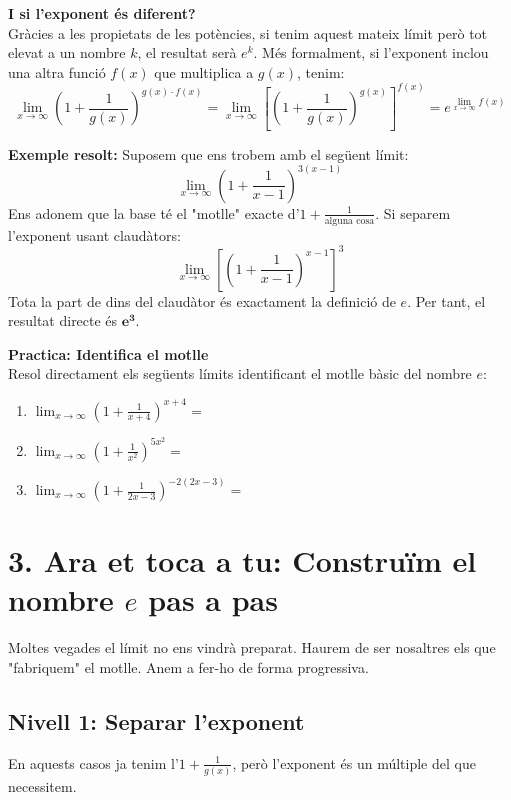 \documentclass[12pt,a4paper]{article}
\begin{document}
\textbf{I si l'exponent és diferent?} \\
Gràcies a les propietats de les potències, si tenim aquest mateix límit però tot elevat a un nombre $k$, el resultat serà $e^k$. Més formalment, si l'exponent inclou una altra funció $f(x)$ que multiplica a $g(x)$, tenim:
\[ \lim_{x \to \infty} \left( 1 + \frac{1}{g(x)} \right)^{g(x) \cdot f(x)} = \lim_{x \to \infty} \left[ \left( 1 + \frac{1}{g(x)} \right)^{g(x)} \right]^{f(x)} = e^{\lim_{x \to \infty} f(x)} \]

\vspace{0.3cm}
\textbf{Exemple resolt:}
Suposem que ens trobem amb el següent límit:
\[ \lim_{x \to \infty} \left( 1 + \frac{1}{x-1} \right)^{3(x-1)} \]
Ens adonem que la base té el "motlle" exacte d'$1 + \frac{1}{\text{alguna cosa}}$. Si separem l'exponent usant claudàtors:
\[ \lim_{x \to \infty} \left[ \left( 1 + \frac{1}{x-1} \right)^{x-1} \right]^3 \]
Tota la part de dins del claudàtor és exactament la definició de $e$. Per tant, el resultat directe és $\mathbf{e^3}$.

\vspace{0.3cm}
\textbf{Practica: Identifica el motlle} \\
Resol directament els següents límits identificant el motlle bàsic del nombre $e$:
\begin{enumerate}[label=\alph*)]
    \item $\displaystyle \lim_{x \to \infty} \left( 1 + \frac{1}{x+4} \right)^{x+4} = $ \vspace{0.2cm}
    \item $\displaystyle \lim_{x \to \infty} \left( 1 + \frac{1}{x^2} \right)^{5x^2} = $ \vspace{0.2cm}
    \item $\displaystyle \lim_{x \to \infty} \left( 1 + \frac{1}{2x-3} \right)^{-2(2x-3)} = $
\end{enumerate}

\vspace{0.8cm}

\newpage
\section*{3. Ara et toca a tu: Construïm el nombre $e$ pas a pas}

Moltes vegades el límit no ens vindrà preparat. Haurem de ser nosaltres els que "fabriquem" el motlle. Anem a fer-ho de forma progressiva.

\subsection*{Nivell 1: Separar l'exponent}
En aquests casos ja tenim l'$1 + \frac{1}{g(x)}$, però l'exponent és un múltiple del que necessitem.
\end{document}
